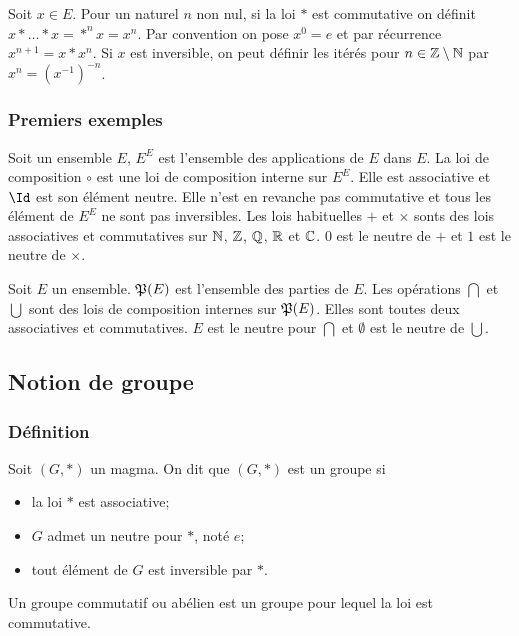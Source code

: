 Soit $x \in E$. Pour un naturel $n$ non nul, si la loi $*$ est commutative on définit $x * \ldots *x = *^{n} x = x^n$. Par convention on pose $x^0=e$ et par récurrence $x^{n+1}=x*x^{n}$. Si $x$ est inversible, on peut définir les itérés pour $n \in \mathbb{Z}\setminus\mathbb{N}$ par $x^n=(x^{-1})^{-n}$.

\subsubsection{Premiers exemples}

Soit un ensemble $E$, $E^E$ est l'ensemble des applications de $E$ dans $E$. La loi de composition $\circ$ est une loi de composition interne sur $E^E$. Elle est associative et $\Id$ est son élément neutre. Elle n'est en revanche pas commutative et tous les élément de $E^E$ ne sont pas inversibles. Les lois habituelles $+$ et $\times$ sonts des lois associatives et commutatives sur $\mathbb{N}$, $\mathbb{Z}$, $\mathbb{Q}$, $\mathbb{R}$ et $\mathbb{C}$. $0$ est le neutre de $+$ et $1$ est le neutre de $\times$.

Soit $E$ un ensemble. $\mathfrak{P}(E)$ est l'ensemble des parties de $E$. Les opérations $\bigcap$ et $\bigcup$ sont des lois de composition internes sur $\mathfrak{P}(E)$. Elles sont toutes deux associatives et commutatives. $E$ est le neutre pour $\bigcap$ et $\emptyset$ est le neutre de $\bigcup$.

\subsection{Notion de groupe}

\subsubsection{Définition}

\begin{defdef}
  Soit $(G,*)$ un magma. On dit que $(G,*)$ est un groupe si
  \begin{itemize}
  \item la loi $*$ est associative;
  \item $G$ admet un neutre pour $*$, noté $e$;
  \item tout élément de $G$ est inversible par $*$.
  \end{itemize}
\end{defdef}
\begin{defdef}
  Un groupe commutatif ou abélien est un groupe pour lequel la loi est commutative.
\end{defdef}

